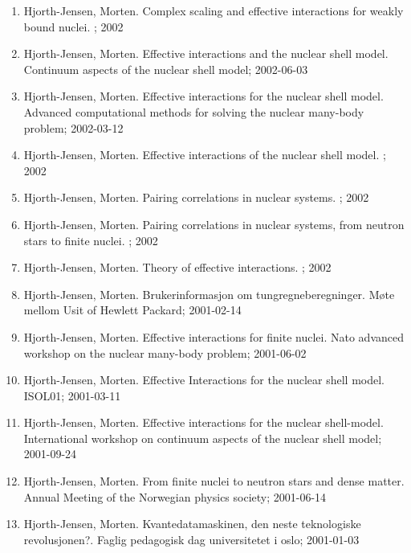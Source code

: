 \documentclass[%
oneside,                 %
final,                   %
10pt]{article}
\begin{document}
\begin{enumerate}
\item Hjorth-Jensen, Morten. Complex scaling and effective interactions for weakly bound nuclei. ; 2002

\item Hjorth-Jensen, Morten. Effective interactions and the nuclear shell model. Continuum aspects of the nuclear shell model; 2002-06-03

\item Hjorth-Jensen, Morten. Effective interactions for the nuclear shell model. Advanced computational methods for solving the nuclear many-body problem; 2002-03-12

\item Hjorth-Jensen, Morten. Effective interactions of the nuclear shell model. ; 2002

\item Hjorth-Jensen, Morten. Pairing correlations in nuclear systems. ; 2002

\item Hjorth-Jensen, Morten. Pairing correlations in nuclear systems, from neutron stars to finite nuclei. ; 2002

\item Hjorth-Jensen, Morten. Theory of effective interactions. ; 2002

\item Hjorth-Jensen, Morten. Brukerinformasjon om tungregneberegninger. Møte mellom Usit of Hewlett Packard; 2001-02-14

\item Hjorth-Jensen, Morten. Effective interactions for finite nuclei. Nato advanced workshop on the nuclear many-body problem; 2001-06-02

\item Hjorth-Jensen, Morten. Effective Interactions for the nuclear shell model. ISOL01; 2001-03-11

\item Hjorth-Jensen, Morten. Effective interactions for the nuclear shell-model. International workshop on continuum aspects of the nuclear shell model; 2001-09-24

\item Hjorth-Jensen, Morten. From finite nuclei to neutron stars and dense matter. Annual Meeting of the Norwegian physics society; 2001-06-14

\item Hjorth-Jensen, Morten. Kvantedatamaskinen, den neste teknologiske revolusjonen?. Faglig pedagogisk dag universitetet i oslo; 2001-01-03


\end{enumerate}
\end{document}
